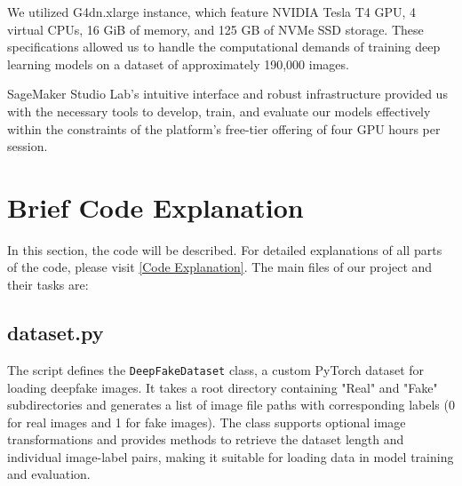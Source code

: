 \documentclass[conference]{IEEEtran}
\begin{document}
We utilized G4dn.xlarge instance, which feature NVIDIA Tesla T4 GPU, 4 virtual CPUs, 16 GiB of memory, and 125 GB of NVMe SSD storage. These specifications allowed us to handle the computational demands of training deep learning models on a dataset of approximately 190,000 images.

SageMaker Studio Lab's intuitive interface and robust infrastructure provided us with the necessary tools to develop, train, and evaluate our models effectively within the constraints of the platform's free-tier offering of four GPU hours per session.

\section{Brief Code Explanation}

In this section, the code will be described. For detailed explanations of all parts of the code, please visit \href{https://github.com/konradwojda/HYU-AI-G08/blob/main/docs/code_explanation.md}{[Code Explanation]}. The main files of our project and their tasks are:


    \subsection*{dataset.py}
    The script defines the \texttt{DeepFakeDataset} class, a custom PyTorch dataset for loading deepfake images. It takes a root directory containing "Real" and "Fake" subdirectories and generates a list of image file paths with corresponding labels (0 for real images and 1 for fake images). The class supports optional image transformations and provides methods to retrieve the dataset length and individual image-label pairs, making it suitable for loading data in model training and evaluation.
\end{document}
